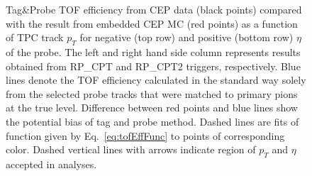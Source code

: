 \begin{figure}[h!]
{\begin{subfigure}[b]{\linewidth}
  \end{subfigure}
}%
\caption[Tag\&Probe TOF efficiency from CEP data compared with the result from embedded CEP MC (divided w.r.t. $\eta$ of the probe).]%
    {Tag\&Probe TOF efficiency from CEP data (black points) compared with the result from embedded CEP MC (red points) as a function of TPC track $p_{T}$ for negative (top row) and positive (bottom row) $\eta$ of the probe. The left and right hand side column represents results obtained from RP\_CPT and RP\_CPT2 triggers, respectively. Blue lines denote the TOF efficiency calculated in the standard way solely from the selected probe tracks that were matched to primary pions at the true level. Difference between red points and blue lines show the potential bias of tag and probe method. Dashed lines are fits of function given by Eq.~\eqref{eq:tofEffFunc} to points of corresponding color. Dashed vertical lines with arrows indicate region of $p_{T}$ and $\eta$ accepted in analyses.}\label{fig:tofEffSyst_etaBins}%
\end{figure}





